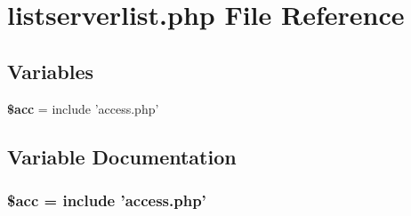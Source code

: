 \section{listserverlist.php File Reference}
\label{listserverlist_8php}


\subsection*{Variables}
\begin{CompactItemize}
\item 
{\bf \$acc} = include 'access.php'
\end{CompactItemize}


\subsection{Variable Documentation}
\subsubsection{\setlength{\rightskip}{0pt plus 5cm}\$acc = include 'access.php'}\label{listserverlist_8php_542926c588a05eb69553d79c83cf73da}


